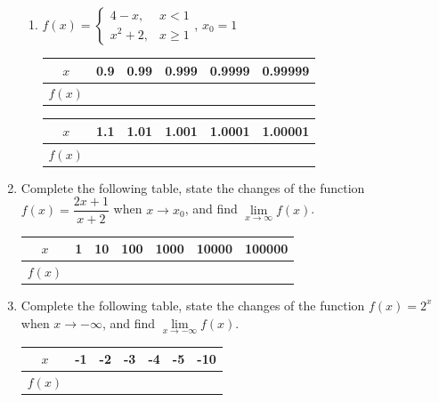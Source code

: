\documentclass[12pt]{report}
\begin{document}
\begin{enumerate}
\begin{enumerate}
          \item $f (x) = \left\{\begin{array}{rl}
                    4 - x,   & x < 1    \\
                    x^2 + 2, & x \geq 1
                  \end{array}\right.$, $x_0 = 1$
                \begin{center}
                  \begin{tabular}{|c|c|c|c|c|c|}
                    \hline
                    $x$     & 0.9 & 0.99 & 0.999 & 0.9999 & 0.99999 \\
                    \hline
                    $f (x)$ &     &      &       &        &         \\
                    \hline
                  \end{tabular}
                  \vskip 0.2cm
                  \begin{tabular}{|c|c|c|c|c|c|}
                    \hline
                    $x$     & 1.1 & 1.01 & 1.001 & 1.0001 & 1.00001 \\
                    \hline
                    $f (x)$ &     &      &       &        &         \\
                    \hline
                  \end{tabular}
                \end{center}
        \end{enumerate}

  \item Complete the following table, state the changes of the function $f (x) =
          \dfrac{2x + 1}{x + 2}$ when $x \to x_0$, and find $\lim\limits_{x \to \infty} f
          (x)$.
        \begin{center}
          \begin{tabular}{|c|c|c|c|c|c|c|}
            \hline
            $x$     & 1 & 10 & 100 & 1000 & 10000 & 100000 \\
            \hline
            $f (x)$ &   &    &     &      &       &        \\
            \hline
          \end{tabular}
        \end{center}

  \item Complete the following table, state the changes of the function $f (x) = 2^x$
        when $x \to -\infty$, and find $\lim\limits_{x \to -\infty} f (x)$.
        \begin{center}
          \begin{tabular}{|c|c|c|c|c|c|c|}
            \hline
            $x$     & -1 & -2 & -3 & -4 & -5 & -10 \\
            \hline
            $f (x)$ &    &    &    &    &    &     \\
            \hline
          \end{tabular}
        \end{center}
\end{enumerate}
\end{document}
